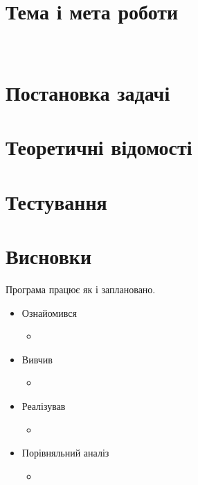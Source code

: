 \nocite{*}
\sffamily

\section{Тема і мета роботи}
 \\


\section{Постановка задачі}

\section{Теоретичні відомості}

\section{Тестування}

\section{Висновки}
Програма працює як і заплановано.

\begin{itemize}
	\item Ознайомився
		\begin{itemize}
			\item
		\end{itemize}
	\item Вивчив
		\begin{itemize}
			\item
		\end{itemize}
	\item Реалізував
		\begin{itemize}
			\item
		\end{itemize}
	\item Порівняльний аналіз
		\begin{itemize}
			\item
		\end{itemize}
\end{itemize}